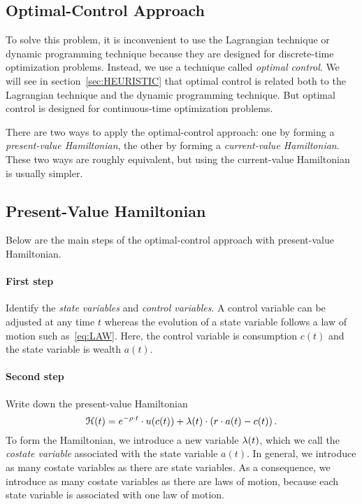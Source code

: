 \documentclass[letterpaper,12pt,leqno]{article}
\begin{document}
\subsection{Optimal-Control Approach}

To solve this problem, it is inconvenient to use the Lagrangian technique or dynamic programming technique because they are designed for discrete-time optimization problems. Instead, we use a technique called \textit{optimal control}. We will see in section~\ref{sec:HEURISTIC} that optimal control is related both to the Lagrangian technique and the dynamic programming technique. But optimal control is designed for continuous-time optimization problems. 

There are two ways to apply the optimal-control approach: one by forming a \textit{present-value Hamiltonian}, the other by forming a \textit{current-value Hamiltonian}. These two ways are roughly equivalent, but using the current-value Hamiltonian is usually simpler.

\subsection{Present-Value Hamiltonian}

Below are the main steps of the optimal-control approach with present-value Hamiltonian.

\paragraph{First step} Identify the \textit{state variables} and \textit{control variables}. A control variable can be adjusted at any time $t$ whereas the evolution of a state variable follows a law of motion such as~\eqref{eq:LAW}. Here, the control variable is consumption $c(t)$ and the state variable is wealth $a(t)$.

\paragraph{Second step} Write down the present-value Hamiltonian
\begin{equation*}
\mathcal{H}(t) = e^{-\rho \cdot t}\cdot u(c(t)) +\lambda(t) \cdot \left( r\cdot a(t) - c(t) \right).
\end{equation*}
To form the Hamiltonian, we introduce a new variable $\lambda(t)$, which we call the \textit{costate variable} associated with the state variable $a(t)$. In general, we introduce as many costate variables as there are state variables. As a consequence, we introduce as many costate variables as there are laws of motion, because each state variable is associated with one law of motion.
\end{document}
